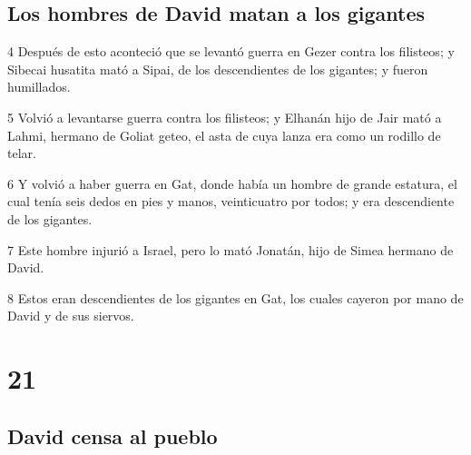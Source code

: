 \section*{Los hombres de David matan a los gigantes}

\par 4 Después de esto aconteció que se levantó guerra en Gezer contra los filisteos; y Sibecai husatita mató a Sipai, de los descendientes de los gigantes; y fueron humillados.
\par 5 Volvió a levantarse guerra contra los filisteos; y Elhanán hijo de Jair mató a Lahmi, hermano de Goliat geteo, el asta de cuya lanza era como un rodillo de telar. 
\par 6 Y volvió a haber guerra en Gat, donde había un hombre de grande estatura, el cual tenía seis dedos en pies y manos, veinticuatro por todos; y era descendiente de los gigantes.
\par 7 Este hombre injurió a Israel, pero lo mató Jonatán, hijo de Simea hermano de David.
\par 8 Estos eran descendientes de los gigantes en Gat, los cuales cayeron por mano de David y de sus siervos.

\chapter{21}

\section*{David censa al pueblo}

